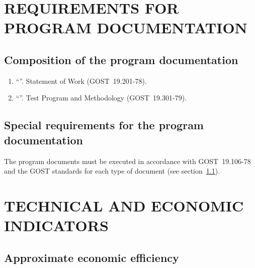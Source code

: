 \documentclass[12pt,a4paper]{extarticle}
\begin{document}
\clearpage

\section{REQUIREMENTS FOR PROGRAM DOCUMENTATION}

\subsection{Composition of the program documentation}
\label{sec:doc_composition}

\begin{enumerate}[label=\arabic*), leftmargin=1.25cm]
\item \enquote{\projectname}. Statement of Work (GOST~19.201-78).
\item \enquote{\projectname}. Test Program and Methodology (GOST~19.301-79).
\end{enumerate}

\subsection{Special requirements for the program documentation}
\label{sec:doc_reqs}

The program documents must be executed in accordance with GOST~19.106-78 and the GOST standards for each type of document (see section~\ref{sec:doc_composition}).

\clearpage

\section{TECHNICAL AND ECONOMIC INDICATORS}

\subsection{Approximate economic efficiency}
\end{document}
